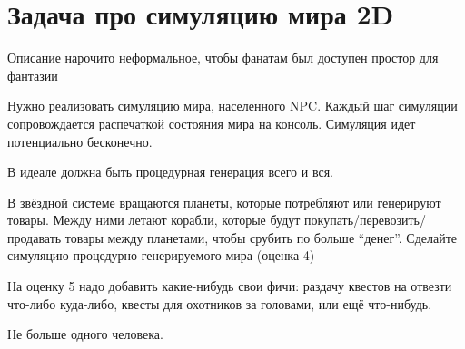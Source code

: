 \documentclass[a4paper,14pt]{article}
\begin{document}
\section{Задача про симуляцию мира 2D}

Описание нарочито неформальное, чтобы фанатам был доступен простор для фантазии

Нужно реализовать симуляцию мира, населенного NPC. Каждый шаг симуляции сопровождается распечаткой состояния мира на консоль. Симуляция идет потенциально бесконечно.

В идеале должна быть процедурная генерация всего и вся. 

В звёздной системе вращаются планеты, которые потребляют или генерируют товары. Между ними летают корабли, которые будут покупать/перевозить/продавать товары между планетами, чтобы срубить по больше ``денег''. Сделайте симуляцию процедурно-генерируемого мира (оценка 4)

На оценку 5 надо добавить какие-нибудь свои фичи: раздачу квестов на отвезти что-либо куда-либо, квесты для охотников за головами, или ещё что-нибудь.

Не больше одного человека.
\end{document}
